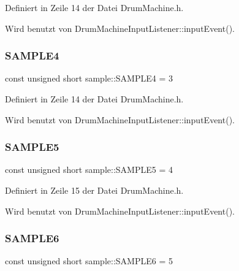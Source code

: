 Definiert in Zeile 14 der Datei Drum\+Machine.\+h.



Wird benutzt von Drum\+Machine\+Input\+Listener\+::input\+Event().

\mbox{\label{namespacesample_ac15354120ebb7dccc9ba3f548e996148}} 
\subsubsection{\texorpdfstring{S\+A\+M\+P\+L\+E4}{SAMPLE4}}
{\footnotesize\ttfamily const unsigned short sample\+::\+S\+A\+M\+P\+L\+E4 = 3}



Definiert in Zeile 14 der Datei Drum\+Machine.\+h.



Wird benutzt von Drum\+Machine\+Input\+Listener\+::input\+Event().

\mbox{\label{namespacesample_ae4dc2e0aefa868bda5be2fcdc695ef4e}} 
\subsubsection{\texorpdfstring{S\+A\+M\+P\+L\+E5}{SAMPLE5}}
{\footnotesize\ttfamily const unsigned short sample\+::\+S\+A\+M\+P\+L\+E5 = 4}



Definiert in Zeile 15 der Datei Drum\+Machine.\+h.



Wird benutzt von Drum\+Machine\+Input\+Listener\+::input\+Event().

\mbox{\label{namespacesample_af6cf4e0873f330ffdf8d341aca16d6cc}} 
\subsubsection{\texorpdfstring{S\+A\+M\+P\+L\+E6}{SAMPLE6}}
{\footnotesize\ttfamily const unsigned short sample\+::\+S\+A\+M\+P\+L\+E6 = 5}



